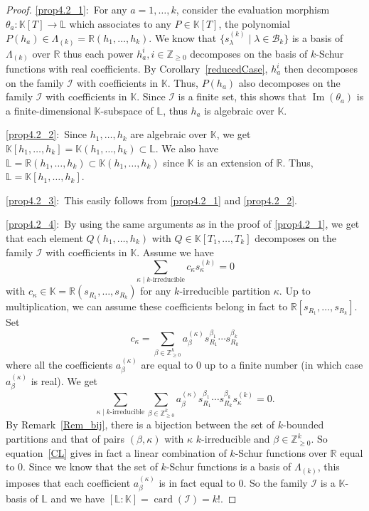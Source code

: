 \documentclass[10pt,a4paper]{amsart}
\theoremstyle{definition}
\DeclareMathOperator{\Imrm}{Im}
\DeclareMathOperator{\card}{card}
\begin{document}
\begin{proof}
\eqref{prop4.2_1}:~For any $a=1,\ldots,k$, consider the evaluation morphism $\theta
_{a}:\mathbb{K}[T]\rightarrow\mathbb{L}$ which associates to any
$P\in\mathbb{K}[T]$, the polynomial $P(h_{a})\in\Lambda_{(k)}\mathbb{=R}%
(h_{1},\ldots,h_{k})$. We know that $\{s_{\lambda}^{(k)}\mid\lambda
\in\mathcal{B}_{k}\}$ is a basis of $\Lambda_{(k)}$ over $\mathbb{R}$ thus
each power $h_{a}^{i},i\in\mathbb{Z}_{\geq0}$ decomposes on the basis of
$k$-Schur functions with real coefficients. By Corollary~\ref{reducedCase},
$h_{a}^{i}$ then decomposes on the family $\mathcal{I}$ with coefficients in
$\mathbb{K}$. Thus, $P(h_{a})$ also decomposes on the family $\mathcal{I}$
with coefficients in $\mathbb{K}$. Since $\mathcal{I}$ is a finite set, this
shows that $\Imrm (\theta_{a})$ is a finite-dimensional $\mathbb{K}%
$-subspace of $\mathbb{L}$, thus $h_{a}$ is algebraic over $\mathbb{K}$.

\eqref{prop4.2_2}:~Since $h_{1},\ldots,h_{k}$ are algebraic over $\mathbb{K}$, we get
$\mathbb{K}[h_{1},\ldots,h_{k}]=\mathbb{K}(h_{1},\ldots,h_{k})\subset
\mathbb{L}$. We also have $\mathbb{L}=\mathbb{R}(h_{1},\ldots,h_{k}%
)\subset\mathbb{K}(h_{1},\ldots,h_{k})$ since $\mathbb{K}$ is an extension of
$\mathbb{R}$. Thus, $\mathbb{L}=\mathbb{K}[h_{1},\ldots,h_{k}]$.

\eqref{prop4.2_3}:~This easily follows from \eqref{prop4.2_1} and \eqref{prop4.2_2}.

\eqref{prop4.2_4}:~By using the same arguments as in the proof of \eqref{prop4.2_1}, we get that each element
$Q(h_{1},\ldots,h_{k})$ with $Q\in\mathbb{K}[T_{1},\ldots,T_{k}]$ decomposes
on the family $\mathcal{I}$ with coefficients in $\mathbb{K}$. Assume we have
\[
\sum_{\kappa\mid k\text{-irreducible}}c_{\kappa}s_{\kappa}^{(k)}=0
\]
with $c_{\kappa}\in\mathbb{K}=\mathbb{R}(s_{R_{1}},\ldots,s_{R_{k}})$ for any
$k$-irreducible partition $\kappa$. Up to multiplication, we can assume these
coefficients belong in fact to $\mathbb{R}[s_{R_{1}},\ldots,s_{R_{k}}]$. Set
\[
c_{\kappa}=\sum_{\beta\in\mathbb{Z}_{\geq0}^{k}}a_{\beta}^{(\kappa)}s_{R_{1}%
}^{\beta_{1}}\cdots s_{R_{k}}^{\beta_{k}}%
\]
where all the coefficients $a_{\beta}^{(\kappa)}$ are equal to $0$ up to a
finite number (in which case $a_{\beta}^{(\kappa)}$ is real). We get%
\begin{equation}
\sum_{\kappa\mid k\text{-irreducible}}\sum_{\beta\in\mathbb{Z}_{\geq0}^{k}%
}a_{\beta}^{(\kappa)}s_{R_{1}}^{\beta_{1}}\cdots s_{R_{k}}^{\beta_{k}%
}s_{\kappa}^{(k)}=0. \label{CL}%
\end{equation}
By Remark~\ref{Rem_bij}, there is a bijection between the set of $k$-bounded
partitions and that of pairs $(\beta,\kappa)$ with $\kappa$ $k$-irreducible
and $\beta\in\mathbb{Z}_{\geq0}^{k}$. So equation~\eqref{CL} gives in fact a
linear combination of $k$-Schur functions over $\mathbb{R}$ equal to $0$.
Since we know that the set of $k$-Schur functions is a basis of $\Lambda
_{(k)}$, this imposes that each coefficient $a_{\beta}^{(\kappa)}$ is in fact
equal to $0$. So the family $\mathcal{I}$ is a $\mathbb{K}$-basis of
$\mathbb{L}$ and we have $[\mathbb{L}:\mathbb{K}]=\card (\mathcal{I}%
)=k!.$


\end{proof}
\end{document}
